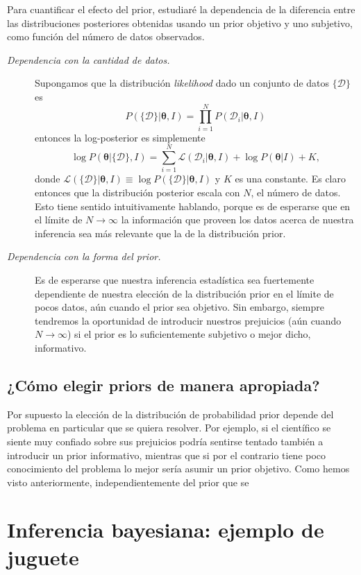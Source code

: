 \documentclass[a4paper,twoside]{article}
\newcommand{\hip}{\ensuremath{\bm{\theta}}\xspace}
\newcommand{\dat}{\ensuremath{\{\mathcal{D}\}}\xspace}
\begin{document}
Para cuantificar el efecto del prior, estudiaré la dependencia de la diferencia entre las
distribuciones posteriores obtenidas usando un prior objetivo y uno subjetivo, como función del
número de datos observados.

\begin{description}
%
\item[\textit{\color{teal} Dependencia con la cantidad de datos.}] Supongamos que la distribución
\emph{likelihood} dado un conjunto de datos $\dat$ es
%
$$
P(\dat|\hip,I) = \prod_{i=1}^N P(\mathcal{D}_i|\hip,I)
$$
%
entonces la log-posterior es simplemente
%
$$
\log{P(\hip|\dat,I)} = \sum_{i=1}^N\mathcal{L}(\mathcal{D}_i|\hip,I) + \log{P(\hip|I)} + K,
$$
%
donde $\mathcal{L}(\dat|\hip,I)\equiv\log{P(\dat|\hip,I)}$ y $K$ es una constante. Es claro entonces
que la distribución posterior escala con $N$, el número de datos. Esto tiene sentido intuitivamente
hablando, porque es de esperarse que en el límite de $N\to\infty$ la información que proveen los
datos acerca de nuestra inferencia sea más relevante que la de la distribución prior.
%
\item[\textit{\color{teal} Dependencia con la forma del prior.}] Es de esperarse que nuestra
inferencia estadística sea fuertemente dependiente de nuestra elección de la distribución prior en
el límite de pocos datos, aún cuando el prior sea objetivo. Sin embargo, siempre tendremos la
oportunidad de introducir nuestros prejuicios (aún cuando $N\to\infty$) si el prior es lo
suficientemente subjetivo o mejor dicho, informativo.
%
\end{description}

\subsection*{¿Cómo elegir priors de manera apropiada?}
%
Por supuesto la elección de la distribución de probabilidad prior depende del problema en particular
que se quiera resolver. Por ejemplo, si el científico se siente muy confiado sobre sus prejuicios
podría sentirse tentado también a introducir un prior informativo, mientras que si por el contrario
tiene poco conocimiento del problema lo mejor sería asumir un prior objetivo. Como hemos visto
anteriormente, independientemente del prior que se

\section{Inferencia bayesiana: ejemplo de juguete}
\end{document}
